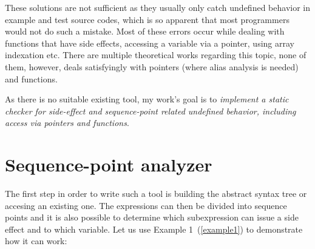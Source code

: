 These solutions are not sufficient as they usually only catch undefined behavior in example and test source codes, which is so apparent that most programmers would not do such a mistake. Most of these errors occur while dealing with functions that have side effects, accessing a variable via a pointer, using array indexation etc.
There are multiple theoretical works regarding this topic, none of them, however, deals satisfyingly with pointers (where alias analysis is needed)~\cite{aliasAnalysis} and functions.

As there is no suitable existing tool, my work's goal is to \emph{implement a static checker for side-effect and sequence-point related undefined behavior, including access via pointers and functions}.

\chapter{Sequence-point analyzer}
The first step in order to write such a tool is building the abstract syntax tree or accesing an existing one. The expressions can then be divided into sequence points and it is also possible to determine which subexpression can issue a side effect and to which variable. Let us use Example 1~(\ref{example1}) to demonstrate how it can work:

